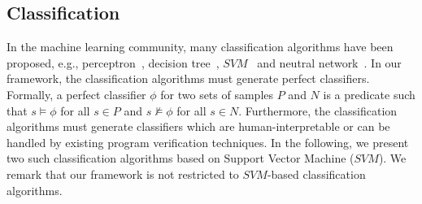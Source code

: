 \subsection{Classification}
In the machine learning community, many classification algorithms have been proposed, 
e.g., perceptron~\cite{perceptron}, decision tree~\cite{quinlan1986induction}, $\mathit{SVM}$~\cite{svm:original} and neutral network~\cite{nn}.
In our framework, the classification algorithms must generate perfect classifiers. 
Formally, a perfect classifier $\phi$ for two sets of samples $P$ and $N$ is a predicate such that $s \models \phi$ for all $\mathit{s \in P}$ and $\mathit{s \not \models \phi}$ for all $\mathit{s \in N}$. 
Furthermore, the classification algorithms must generate classifiers which are human-interpretable or can be handled by existing program verification techniques. 
In the following, we present two such classification algorithms based on Support Vector Machine ($\mathit{SVM}$). 
We remark that our framework is not restricted to $\mathit{SVM}$-based classification algorithms.
